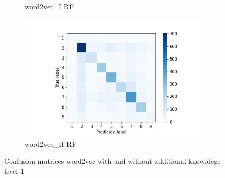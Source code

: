 \documentclass[12pt, a4paper, titlepage]{article}
\begin{document}
\begin{figure}[]
\begin{subfigure}[b]{0.475\textwidth}
    {{\small word2vec\_I RF}}    
  \end{subfigure}
  \hfill
  \begin{subfigure}[b]{0.475\textwidth}   
      \centering 
      \includegraphics[width=\textwidth]{cm_word2vec_with_RF.jpg}
      {{\small word2vec\_II RF}}    
  \end{subfigure}
  \caption{\label{fig: F23} Confusion matrices word2vec with and without additional knowldege level 1}
\end{figure}
\end{document}
